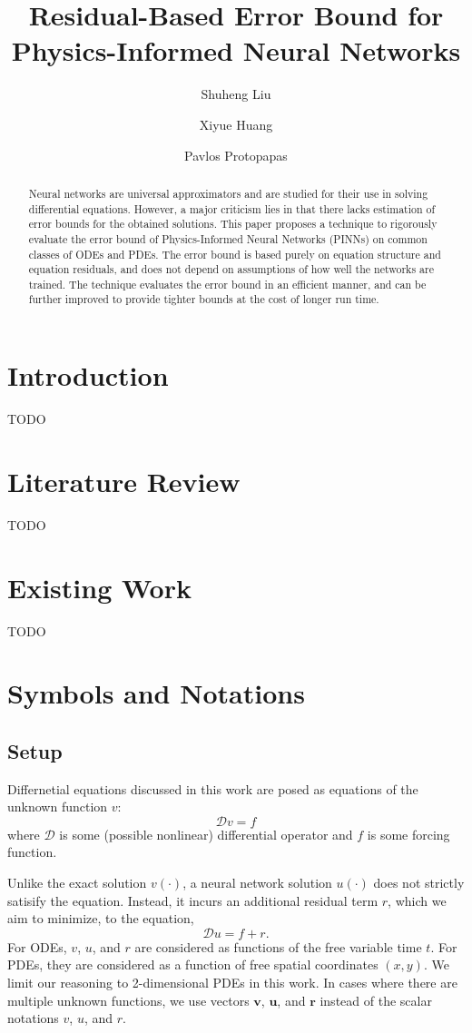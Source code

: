 \documentclass[accepted]{uai2023}
\title{Residual-Based Error Bound for Physics-Informed Neural Networks}
\author[1]{Shuheng Liu}
\author[2]{Xiyue Huang}
\author[3]{Pavlos Protopapas}
\affil[1, 3]{
    Intitute for Applied Computational Science\\
    Harvard University\\
    Cambridge, Massachusetts, USA
}
\affil[2]{
    Carnegie Mellon University \\
    Pittsburgh, Pennsylvania, USA
}
\newcommand{\vect}[1]{\boldsymbol{\mathbf{#1}}}
\begin{document}
\maketitle

\begin{abstract}
    Neural networks are universal approximators and are studied for their use in solving differential equations.
    However, a major criticism lies in that there lacks estimation of error bounds for the obtained solutions.
    This paper proposes a technique to rigorously evaluate the error bound of Physics-Informed Neural Networks (PINNs) on common classes of ODEs and PDEs.
    The error bound is based purely on equation structure and equation residuals, and does not depend on assumptions of how well the networks are trained.
    The technique evaluates the error bound in an efficient manner, and can be further improved to provide tighter bounds at the cost of longer run time.
\end{abstract}

\section{Introduction}
    TODO

\section{Literature Review}
    TODO

\section{Existing Work}
    TODO
\section{Symbols and Notations}

\subsection{Setup}
    Differnetial equations discussed in this work are posed as equations of the unknown function $v$:
    \begin{equation*}
        \mathcal{D} v = f
    \end{equation*}
    where $\mathcal{D}$ is some (possible nonlinear) differential operator and $f$ is some forcing function.

    Unlike the exact solution $v(\cdot)$, a neural network solution $u(\cdot)$ does not strictly satisify the equation.
    Instead, it incurs an additional residual term $r$, which we aim to minimize, to the equation, 
    \begin{equation*}
        \mathcal{D} u = f + r.
    \end{equation*}
    For ODEs, $v$, $u$, and $r$ are considered as functions of the free variable time $t$.
    For PDEs, they are considered as a function of free spatial coordinates $(x, y)$.
    We limit our reasoning to 2-dimensional PDEs in this work.
    In cases where there are multiple unknown functions, we use vectors $\vect{v}$, $\vect{u}$, and $\vect{r}$ instead of the scalar notations $v$, $u$, and $r$.
\end{document}
